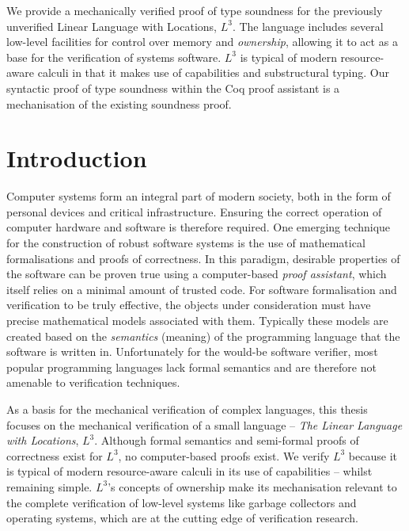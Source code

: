 \documentclass[]{unswthesis}
\newenvironment{abstract}
 {
  \begin{center}
  \bfseries \abstractname\vspace{-.5em}\vspace{0pt}
  \end{center}
  \list{}{
    \setlength{\leftmargin}{.5cm}%
    \setlength{\rightmargin}{\leftmargin}%
  }%
  \item\relax}
 {\endlist}
\begin{document}
\frontmatter  
\maketitle

\begin{abstract}
We provide a mechanically verified proof of type soundness for the previously unverified Linear Language with Locations, $L^3$. The language includes several low-level facilities for control over memory and \textit{ownership}, allowing it to act as a base for the verification of systems software. $L^3$ is typical of modern resource-aware calculi in that it makes use of capabilities and substructural typing. Our syntactic proof of type soundness within the Coq proof assistant is a mechanisation of the existing soundness proof.
\end{abstract}

\tableofcontents

\mainmatter

\chapter{Introduction}
\label{ch:intro}

Computer systems form an integral part of modern society, both in the form of personal devices and critical infrastructure. Ensuring the correct operation of computer hardware and software is therefore required. One emerging technique for the construction of robust software systems is the use of mathematical formalisations and proofs of correctness. In this paradigm, desirable properties of the software can be proven true using a computer-based \textit{proof assistant}, which itself relies on a minimal amount of trusted code. For software formalisation and verification to be truly effective, the objects under consideration must have precise mathematical models associated with them. Typically these models are created based on the \textit{semantics} (meaning) of the programming language that the software is written in. Unfortunately for the would-be software verifier, most popular programming languages lack formal semantics and are therefore not amenable to verification techniques.

As a basis for the mechanical verification of complex languages, this thesis focuses on the mechanical verification of a small language -- \textit{The Linear Language with Locations}, $L^3$. Although formal semantics and semi-formal proofs of correctness exist for $L^3$, no computer-based proofs exist. We verify $L^3$ because it is typical of modern resource-aware calculi in its use of capabilities -- whilst remaining simple. $L^3$'s concepts of ownership make its mechanisation relevant to the complete verification of low-level systems like garbage collectors and operating systems, which are at the cutting edge of verification research.
\end{document}
